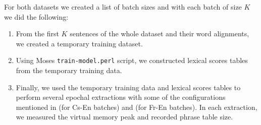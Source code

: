 For both datasets we created a list of batch sizes and with each batch of size $K$ we did the following:
\begin{enumerate}
  \item From the first $K$ sentences of the whole dataset and their word alignments, we
    created a temporary training dataset.
  \item Using Moses \texttt{train-model.perl} script, we constructed lexical scores tables
    from the temporary training data.
  \item Finally, we used the temporary training data and lexical scores tables to perform several epochal
    extractions with some of the configurations mentioned in
     (for Cs-En batches) and  (for Fr-En batches).
    In each extraction, we measured the virtual memory peak and recorded phrase table size.
\end{enumerate}
